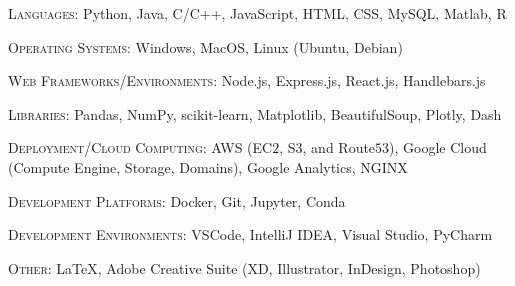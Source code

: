 \documentclass[hidelinks, 10pt]{article}
\begin{document}
{\vspace{6mm}

\hrulefill

\vspace{5mm}

\begin{minipage}[ct]{0.9\linewidth}
\textsc{Languages: } Python, Java, C/C++, JavaScript, HTML, CSS, MySQL, Matlab,
R

\vspace{1.5mm}

\textsc{Operating Systems: } Windows, MacOS, Linux (Ubuntu, Debian)

\vspace{1.5mm}

\textsc{Web Frameworks/Environments: } Node.js, Express.js, React.js, Handlebars.js

\vspace{1.5mm}

\textsc{Libraries: } Pandas, NumPy, scikit-learn, Matplotlib, BeautifulSoup,
Plotly, Dash

\vspace{1.5mm}

\textsc{Deployment/Cloud Computing:} AWS (EC$2$, S$3$, and Route$53$),
Google Cloud (Compute Engine, Storage, Domains), Google Analytics, NGINX

\vspace{1.5mm}

\textsc{Development Platforms: } Docker, Git, Jupyter, Conda

\vspace{1.5mm}

\textsc{Development Environments: } VSCode, IntelliJ IDEA, Visual Studio,
PyCharm

\vspace{1.5mm}

\textsc{Other: } \LaTeX, Adobe Creative Suite (XD, Illustrator, InDesign, Photoshop)
\end{minipage}

}
\end{document}
